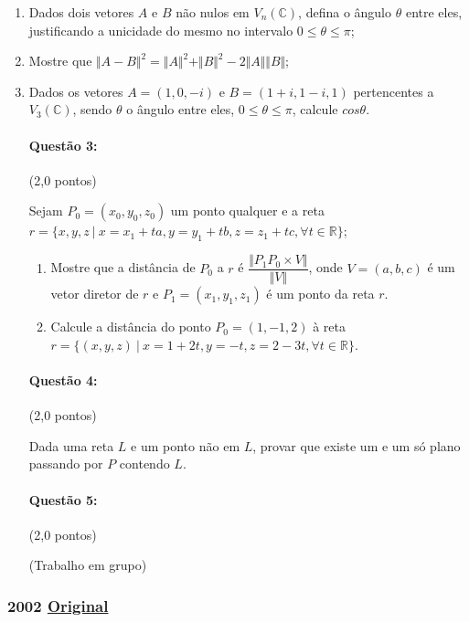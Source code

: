 \documentclass[12pt,a4paper]{article}
\newcommand{\norm}[1]{\Vert #1 \Vert}
\newcommand{\original}[1]{\tiny \href{#1}{Original} \normalsize}
\begin{document}
\begin{enumerate}[label=(\alph*)]
\item Dados dois vetores $A$ e $B$ não nulos em $V_n(\mathbb{C})$, defina o ângulo $\theta$ entre eles, justificando a unicidade do mesmo no intervalo $0 \leq \theta \leq \pi$; 
\item Mostre que $\norm{A-B}^2=\norm{A}^2+\norm{B}^2-2\norm{A}\norm{B}$;
\item Dados os vetores $A=(1,0,-i)$ e $B=(1+i,1-i,1)$ pertencentes a $V_3(\mathbb{C})$, sendo $\theta$ o ângulo entre eles, $0 \leq \theta \leq \pi$, calcule $cos\theta$.

\paragraph{Questão 3:} (2,0 pontos)

Sejam $P_0=(x_0,y_0,z_0)$ um ponto qualquer e a reta $r=\{x,y,z \ | \ x=x_1+ta,y=y_1+tb,z=z_1+tc, \forall t \in \mathbb{R} \}$;
\begin{enumerate}[label=(\alph*)]
\item Mostre que a distância de $P_0$ a $r$ é $\dfrac{\norm{P_1P_0 \times V}}{\norm{V}}$, onde $V=(a,b,c)$ é um vetor diretor de $r$ e $P_1=(x_1,y_1,z_1)$ é um ponto da reta $r$. 
\item Calcule a distância do ponto $P_0=(1,-1,2)$ à reta $r=\{(x,y,z) \ | \ x=1+2t,y=-t,z=2-3t, \forall t \in \mathbb{R}\}$.
\end{enumerate}

\paragraph{Questão 4:} (2,0 pontos)

Dada uma reta $L$ e um ponto não em $L$, provar que existe um e um só plano passando por $P$ contendo $L$. 

\paragraph{Questão 5:} (2,0 pontos)

(Trabalho em grupo)

\end{enumerate}
\normalsize
\newpage
\subsubsection{2002 \original{https://drive.google.com/file/d/1YJSKvgiseMvw9g3bdSrF_NCYUBYVadM-/view?usp=sharing}}
\end{document}
